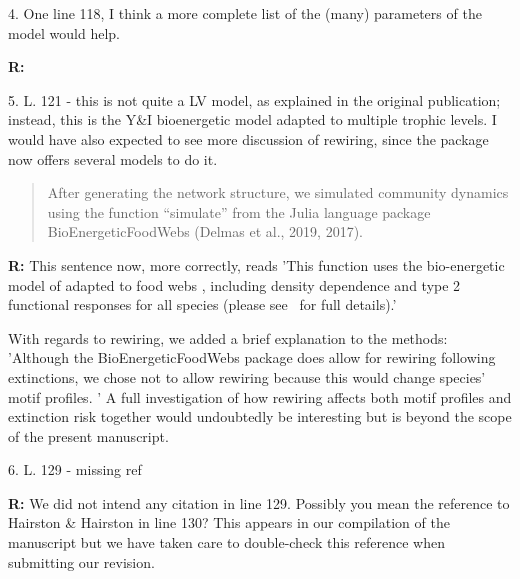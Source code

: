 \documentclass[12pt]{article}
\begin{document}
    \smallskip

    4. One line 118, I think a more complete list of the (many) parameters of the model would help.


    \smallskip

    \textbf{R:}

    \smallskip

    5. L. 121 - this is not quite a LV model, as explained in the original publication; instead, this is the Y\&I bioenergetic model adapted to multiple trophic levels. I would have also expected to see more discussion of rewiring, since the package now offers several models to do it.

    \begin{quotation}
    After generating the network structure, we simulated community dynamics using the function ``simulate'' from the Julia language package BioEnergeticFoodWebs (Delmas et al., 2019, 2017).
    \end{quotation}

    \smallskip

    \textbf{R:} This sentence now, more correctly, reads 'This function uses the bio-energetic model of \citet{Yodzis1992} adapted to food webs \citep{Williams2007}, including density dependence and type 2 functional responses for all species (please see~\citet{Delmas2017} for full details).'
    
    With regards to rewiring, we added a brief explanation to the methods: 'Although the BioEnergeticFoodWebs package does allow for rewiring following extinctions, we chose not to allow rewiring because this would change species' motif profiles. '
    A full investigation of how rewiring affects both motif profiles and extinction risk together would undoubtedly be interesting but is beyond the scope of the present manuscript.

    \smallskip

    6. L. 129 - missing ref

    \smallskip

    \textbf{R:} We did not intend any citation in line 129. Possibly you mean the reference to Hairston \& Hairston in line 130? This appears in our compilation of the manuscript but we have taken care to double-check this reference when submitting our revision.%
\end{document}
